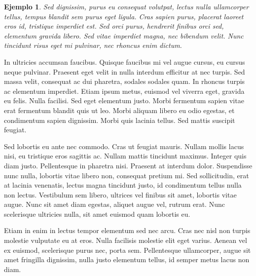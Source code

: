 \documentclass[10pt, a4paper]{article}
\theoremstyle{theorem-style}
\theoremstyle{definition-style}
\theoremstyle{remark-style}
\theoremstyle{example-style}
\newtheorem{ejemplo}{Ejemplo}[section]
\theoremstyle{definition-style}
\theoremstyle{remark-style}
\begin{document}
\begin{ejemplo}
  Sed dignissim, purus eu consequat volutpat, lectus nulla ullamcorper tellus, tempus blandit sem purus eget ligula. Cras sapien purus, placerat laoreet eros id, tristique imperdiet est. Sed orci purus, hendrerit finibus orci sed, elementum gravida libero. Sed vitae imperdiet magna, nec bibendum velit. Nunc tincidunt risus eget mi pulvinar, nec rhoncus enim dictum.
\end{ejemplo}

In ultricies accumsan faucibus. Quisque faucibus mi vel augue cursus, eu cursus neque pulvinar. Praesent eget velit in nulla interdum efficitur at nec turpis. Sed massa velit\footnotemark, consequat ac dui pharetra, sodales sodales quam. In rhoncus turpis ac elementum imperdiet. Etiam ipsum metus, euismod vel viverra eget, gravida eu felis. Nulla facilisi. Sed eget elementum justo. Morbi fermentum sapien vitae erat fermentum blandit quis ut leo. Morbi aliquam libero eu odio egestas, et condimentum sapien dignissim. Morbi quis lacinia tellus. Sed mattis suscipit feugiat.





Sed lobortis eu ante nec commodo. Cras ut feugiat mauris. Nullam mollis lacus nisi, eu tristique eros sagittis ac. Nullam mattis tincidunt maximus. Integer quis diam justo. Pellentesque in pharetra nisi. Praesent at interdum dolor. Suspendisse nunc nulla, lobortis vitae libero non, consequat pretium mi. Sed sollicitudin, erat at lacinia venenatis, lectus magna tincidunt justo, id condimentum tellus nulla non lectus. Vestibulum sem libero, ultrices vel finibus sit amet, lobortis vitae augue. Nunc sit amet diam egestas, aliquet augue vel, rutrum erat. Nunc scelerisque ultricies nulla, sit amet euismod quam lobortis eu.

Etiam in enim in lectus tempor elementum sed nec arcu. Cras nec nisl non turpis molestie vulputate eu at eros. Nulla facilisis molestie elit eget varius. Aenean vel ex euismod, scelerisque purus nec, porta sem. Pellentesque ullamcorper, augue sit amet fringilla dignissim, nulla justo elementum tellus, id semper metus lacus non diam.
\end{document}
